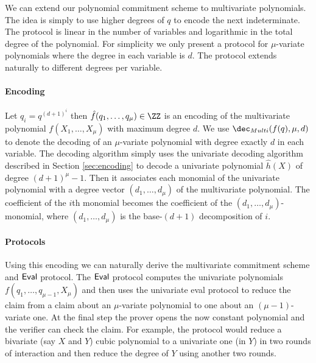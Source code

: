 
We can extend our polynomial commitment scheme to multivariate polynomials. The idea is simply to use higher degrees of $q$ to encode the next indeterminate. The protocol is linear in the number of variables and logarithmic in the total degree of the polynomial. For simplicity we only present a protocol for $\mu$-variate polynomials where the degree in each variable is $d$. The protocol extends naturally to different degrees per variable.

\paragraph{Encoding}
Let $q_i=q^{(d+1)^i}$ then $\hat{f}(q_1,\dots,q_\mu)\in \ZZ$ is an encoding of the multivariate polynomial $f(X_1,\dots,X_\mu)$ with maximum degree $d$. We use $\dec_{Multi}(f(q),\mu,d)$ to denote the decoding of an $\mu$-variate polynomial with degree exactly $d$ in each variable. The decoding algorithm simply uses the univariate decoding algorithm described in Section \ref{sec:encoding} to decode a univariate polynomial $\hat{h}(X)$ of degree $(d+1)^{\mu}-1$.
Then it associates each monomial of the univariate polynomial with a degree vector $(d_1,\dots,d_\mu)$ of the multivariate polynomial. The coefficient of the $i$th monomial becomes the coefficient of the $(d_1,\dots,d_\mu)$-monomial, where $(d_1,\dots,d_\mu)$ is the base-$(d+1)$ decomposition of $i$. 
\paragraph{Protocols}
 Using this encoding we can naturally derive the multivariate commitment scheme and $\textsf{{Eval}}$ protocol. The $\textsf{{Eval}}$ protocol computes the univariate polynomials $f(q_1,\dots,q_{\mu-1},X_\mu)$ and then uses the univariate eval protocol to reduce the claim from a claim about an $\mu$-variate polynomial to one about an $(\mu-1)$-variate one. At the final step the prover opens the now constant polynomial and the verifier can check the claim. For example, the protocol would reduce a bivariate (say $X$ and $Y$) cubic polynomial to a univariate one (in $Y$) in two rounds of interaction and then reduce the degree of $Y$ using another two rounds.
 
